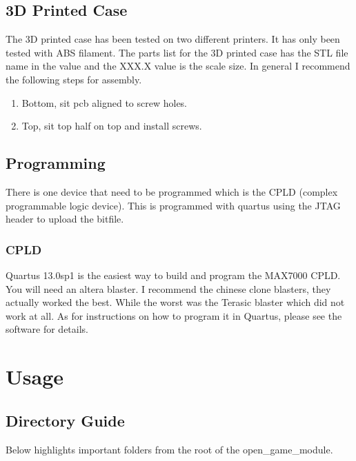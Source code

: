 \subsection{3D Printed Case}

\par
The 3D printed case has been tested on two different printers. It has only been tested with ABS filament.
The parts list for the 3D printed case has the STL file name in the value and the XXX.X value is the scale size.
In general I recommend the following steps for assembly.

\begin{enumerate}
  \item Bottom, sit pcb aligned to screw holes.
  \item Top, sit top half on top and install screws.
\end{enumerate}

\subsection{Programming}

\par
There is one device that need to be programmed which is the CPLD (complex programmable logic device).
This is programmed with quartus using the JTAG header to upload the bitfile.

\subsubsection{CPLD}

\par
Quartus 13.0sp1 is the easiest way to build and program the MAX7000 CPLD. You will need an altera blaster.
I recommend the chinese clone blasters, they actually worked the best. While the worst was the Terasic blaster
which did not work at all. As for instructions on how to program it in Quartus, please see the software for details.

\newpage

\section{Usage}

\subsection{Directory Guide}

\par
Below highlights important folders from the root of the open\_game\_module.

